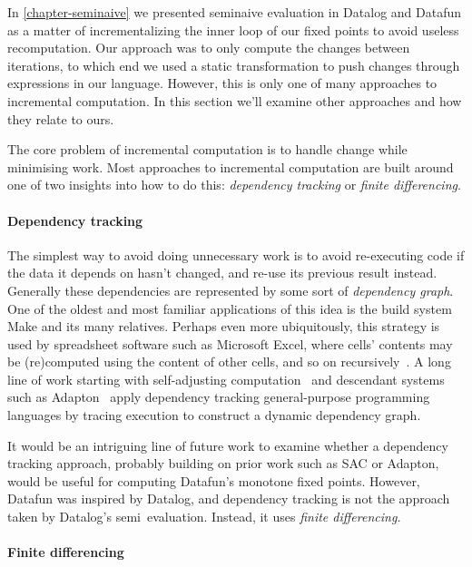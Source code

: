 In \cref{chapter-seminaive} we presented seminaive evaluation in Datalog and
Datafun as a matter of incrementalizing the inner loop of our fixed points to
avoid useless recomputation. Our approach was to only compute the changes
between iterations, to which end we used a static transformation to push changes
through expressions in our language.
%
However, this is only one of many approaches to incremental computation.
%
In this section we'll examine other approaches and how they relate to ours.

The core problem of incremental computation is to handle change while minimising work.
%
Most approaches to incremental computation are built around one of two insights
into how to do this: \emph{dependency tracking} or \emph{finite differencing}.

\paragraph{Dependency tracking}

The simplest way to avoid doing unnecessary work is to avoid re-executing code
if the data it depends on hasn't changed, and re-use its previous result
instead.
%
Generally these dependencies are represented by some sort of \emph{dependency
  graph}.
%
One of the oldest and most familiar applications of this idea is the build
system Make and its many relatives.
%
Perhaps even more ubiquitously, this strategy is used by spreadsheet software such as Microsoft Excel, where cells' contents may be (re)computed using the content of other cells, and so on recursively~\citep{build-systems-a-la-carte}.
%
A long line of work starting with self-adjusting
computation~\citep{DBLP:conf/popl/AcarBH02,umut-acar-thesis} and descendant
systems such as Adapton~\citep{DBLP:conf/pldi/HammerKHF14} apply dependency
tracking general-purpose programming languages by tracing execution to
construct a dynamic dependency graph.

It would be an intriguing line of future work to examine whether a dependency
tracking approach, probably building on prior work such as SAC or Adapton, would
be useful for computing Datafun's monotone fixed points. However, Datafun was
inspired by Datalog, and dependency tracking is not the approach taken by
Datalog's semi\naive\ evaluation. Instead, it uses \emph{finite differencing.}

\paragraph{Finite differencing}

